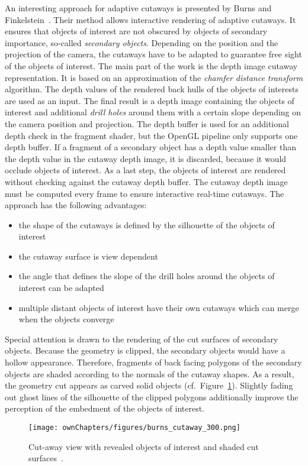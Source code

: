 An interesting approach for adaptive cutaways is presented by Burns and Finkelstein~\cite{jour:adaptiveCutaways}. Their method allows interactive rendering of adaptive cutaways. It ensures that objects of interest are not obscured by objects of secondary importance, so-called \emph{secondary objects}. Depending on the position and the projection of the camera, the cutaways have to be adapted to guarantee free sight of the objects of interest. The main part of the work is the depth image cutaway representation. It is based on an approximation of the \emph{chamfer distance transform} algorithm. The depth values of the rendered back hulls of the objects of interests are used as an input. The final result is a depth image containing the objects of interest and additional \emph{drill holes} around them with a certain slope depending on the camera position and projection. The depth buffer is used for an additional depth check in the fragment shader, but the OpenGL pipeline only supports one depth buffer. If a fragment of a secondary object has a depth value smaller than the depth value in the cutaway depth image, it is discarded, because it would occlude objects of interest. As a last step, the objects of interest are rendered without checking against the cutaway depth buffer. The cutaway depth image must be computed every frame to ensure interactive real-time cutaways. The approach has the following advantages:
\begin{itemize}
	\item the shape of the cutaways is defined by the silhouette of the objects of interest
	\item the cutaway surface is view dependent
	\item the angle that defines the slope of the drill holes around the objects of interest can be adapted
	\item multiple distant objects of interest have their own cutaways which can merge when the objects converge
\end{itemize}

Special attention is drawn to the rendering of the cut surfaces of secondary objects. Because the geometry is clipped, the secondary objects would have a hollow appearance. Therefore, fragments of back facing polygons of the secondary objects are shaded according to the normals of the cutaway shapes. As a result, the geometry cut appears as carved solid objects (cf.~Figure~\ref{fig:burnsCutaway}). Slightly fading out ghost lines of the silhouette of the clipped polygons additionally improve the perception of the embedment of the objects of interest.
\begin{figure}
\centering
\texttt{[image: ownChapters/figures/burns\_cutaway\_300.png]}
\caption{Cut-away view with revealed objects of interest and shaded cut surfaces~\cite{jour:adaptiveCutaways}.}%
\label{fig:burnsCutaway}%
\end{figure}

